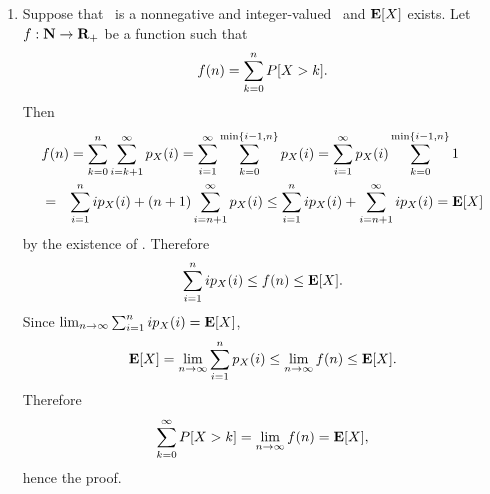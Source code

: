 \begin{enumerate}
\begin{solution}
\begin{enumerate}
		\item Suppose that \X\ is a nonnegative and integer-valued \randvar\
		and ${\bf E}[X]$ exists.
		Let $f:{\mbox{\bf N}}\to{{\mbox{\bf R}}_+}$ be a function such that
		\[
			f(n) = \sum_{k=0}^{n} P[X>k].
		\]
		Then
		\begin{eqnarray*}
			\lefteqn{
			f(n) = \sumkzton \sumto{i}{k+1}{\infty} \pmfxk{i}
			= \sumto{i}{1}{\infty} \sumto{k}{0}{\min\{i-1,n\}} \pmfxk{i}
			= \sumto{i}{1}{\infty} \pmfxk{i} \sumto{k}{0}{\min\{i-1,n\}} 1
			}
			\\&=&
			\sumto{i}{1}{n} i \pmfxk{i}
			+ (n+1) \sumto{i}{n+1}{\infty} \pmfxk{i}
			\leq \sumto{i}{1}{n} i \pmfxk{i}
			+ \sumto{i}{n+1}{\infty} i \pmfxk{i}
			= 
		\end{eqnarray*}
		by the existence of \Exp{X}.
		Therefore
		\[
			\sum_{i=1}^{n} i p_{X}(i) \leq f(n) \leq {\bf E}[X].
		\]
		Since $\lim_{n\to\infty} \sum_{i=1}^{n} i p_{X}(i) = {\bf E}[X]$,
		\[
			{\bf E}[X] = \lim_{n\to\infty} \sum_{i=1}^{n} p_{X}(i)
			\leq \lim_{n\to\infty} f(n)
			\leq {\bf E}[X].
		\]
		Therefore
		\[
			\sum_{k=0}^{\infty} P[X>k] = \lim_{n\to\infty} f(n) = {\bf E}[X],
		\]
		hence the proof.


	\end{enumerate}
	\end{solution}
	\fi



\end{enumerate}






